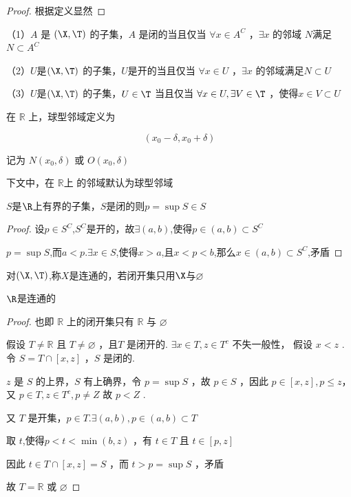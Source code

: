 \begin{proof}
	根据定义显然
\end{proof}
\begin{corollary}
	
	（1）$A$ 是 $(\X, \T)$ 的子集，$A$ 是闭的当且仅当 $\forall x \in A^C$ ，$\exists x$ 的邻域 $N$满足 $N \subset A^C$
	
	（2）$U$是$(\X, \T)$ 的子集，$U$是开的当且仅当 $\forall x \in U$ ，$\exists x$ 的邻域满足$N\subset U$
	
	（3）$U$是$(\X, \T)$ 的子集，$U \in \T$ 当且仅当 $\forall x \in U, \exists V \in \T$ ，使得$x \in V\subset U$
\end{corollary}
\begin{definition}
	在 $\mathbb{R}$ 上，球型邻域定义为
	
	$$
	\left(x_0-\delta, x_0+\delta\right)
	$$
	
	
	记为 $N\left(x_0, \delta\right)$ 或 $O\left(x_0, \delta\right)$ 
	
	下文中，在 $\mathbb{R}$上 的邻域默认为球型邻域
\end{definition}
\begin{lemma}
	$S$是$\R$上有界的子集，$S$是闭的则$p=\sup S\in S$
\end{lemma}
\begin{proof}
	设$p\in S^C$,$S^C$是开的，故$\exists(a,b)$,使得$p\in(a,b)\subset S^C$
	
	$p=\sup S$,而$a<p$.$\exists x\in S$,使得$x>a$,且$x<p<b$,那么$x\in(a,b)\subset S^C$,矛盾
\end{proof}
\begin{definition}
	对$(\X,\T)$,称$X$是连通的，若闭开集只用$\X$与$\varnothing$
\end{definition}
\begin{proposition}
	\label{con_of_R}
	$\R$是连通的
\end{proposition}

\begin{proof}
	也即 $\mathbb{R}$ 上的闭开集只有 $\mathbb{R}$ 与 $\varnothing$
	
	假设 $T \neq \mathbb{R}$ 且 $T \neq \varnothing$ ，且$T$ 是闭开的. $\exists x \in T,  z \in T^c$
	不失一般性， 假设 $x<z$ .令 $S=T \cap[x, z]$ ，$S$ 是闭的.
	
	$z$ 是 $S$ 的上界，$S$ 有上确界，令 $p=\sup S$ ，故 $p \in S$ ，因此 $p \in[x, z], p \leqslant z$，又 $p \in T, z \in T^c, p \neq Z$ 故 $p<Z$ .
	
	又 $T$ 是开集，$p \in T . \exists(a, b), p \in(a, b)\subset T$
	
	取 $t$,使得$p<t<\min (b, z)$ ，有 $t \in T$ 且 $t \in[p, z]$
	
	因此 $t \in T \cap[x, z]=S$ ，而 $t > p=\sup S$ ，矛盾
	
	故 $T=\mathbb{R}$ 或 $\varnothing$
\end{proof}

